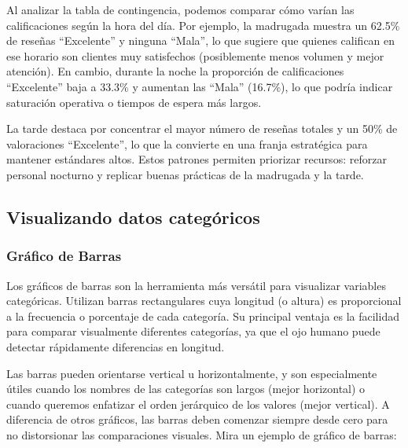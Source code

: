 \documentclass[
  spanish,
  letterpaper,
  DIV=11,
  numbers=noendperiod]{scrreprt}
\begin{document}
Al analizar la tabla de contingencia, podemos comparar cómo varían las
calificaciones según la hora del día. Por ejemplo, la madrugada muestra
un 62.5\% de reseñas ``Excelente'' y ninguna ``Mala'', lo que sugiere
que quienes califican en ese horario son clientes muy satisfechos
(posiblemente menos volumen y mejor atención). En cambio, durante la
noche la proporción de calificaciones ``Excelente'' baja a 33.3\% y
aumentan las ``Mala'' (16.7\%), lo que podría indicar saturación
operativa o tiempos de espera más largos.

La tarde destaca por concentrar el mayor número de reseñas totales y un
50\% de valoraciones ``Excelente'', lo que la convierte en una franja
estratégica para mantener estándares altos. Estos patrones permiten
priorizar recursos: reforzar personal nocturno y replicar buenas
prácticas de la madrugada y la tarde.

\subsection{Visualizando datos
categóricos}\label{visualizando-datos-categuxf3ricos}

\subsubsection{Gráfico de Barras}\label{gruxe1fico-de-barras}

Los gráficos de barras son la herramienta más versátil para visualizar
variables categóricas. Utilizan barras rectangulares cuya longitud (o
altura) es proporcional a la frecuencia o porcentaje de cada categoría.
Su principal ventaja es la facilidad para comparar visualmente
diferentes categorías, ya que el ojo humano puede detectar rápidamente
diferencias en longitud.

Las barras pueden orientarse vertical u horizontalmente, y son
especialmente útiles cuando los nombres de las categorías son largos
(mejor horizontal) o cuando queremos enfatizar el orden jerárquico de
los valores (mejor vertical). A diferencia de otros gráficos, las barras
deben comenzar siempre desde cero para no distorsionar las comparaciones
visuales. Mira un ejemplo de gráfico de barras:
\end{document}
